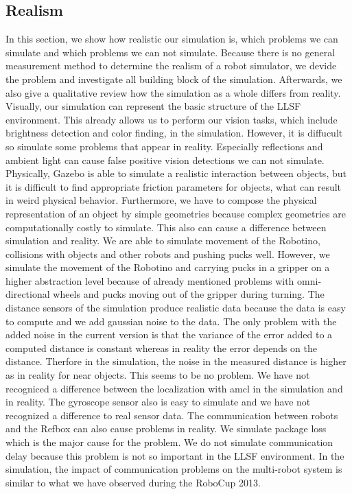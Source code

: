\subsection{Realism}
In this section, we show how realistic our simulation is, which problems we can simulate and which problems we can not simulate. Because there is no general measurement method to determine the realism of a robot simulator, we devide the problem and investigate all building block of the simulation. Afterwards, we also give a qualitative review how the simulation as a whole differs from reality.\\
Visually, our simulation can represent the basic structure of the LLSF environment. This already allows us to perform our vision tasks, which include brightness detection and color finding, in the simulation. However, it is diffucult so simulate some problems that appear in reality. Especially reflections and ambient light can cause false positive vision detections we can not simulate. Physically, Gazebo is able to simulate a realistic interaction between objects, but it is difficult to find appropriate friction parameters for objects, what can result in weird physical behavior. Furthermore, we have to compose the physical representation of an object by simple geometries because complex geometries are computationally costly to simulate. This also can cause a difference between simulation and reality. We are able to simulate movement of the Robotino, collisions with objects and other robots and pushing pucks well. However, we simulate the movement of the Robotino and carrying pucks in a gripper on a higher abstraction level because of already mentioned problems with omni-directional wheels and pucks moving out of the gripper during turning. The distance sensors of the simulation produce realistic data because the data is easy to compute and we add gaussian noise to the data. The only problem with the added noise in the current version is that the variance of the error added to a computed distance is constant whereas in reality the error depends on the distance. Therfore in the simulation, the noise in the measured distance is higher as in reality for near objects. This seems to be no problem. We have not recogniced a difference between the localization with amcl in the simulation and in reality. The gyroscope sensor also is easy to simulate and we have not recognized a difference to real sensor data. The communication between robots and the Refbox can also cause problems in reality. We simulate package loss which is the major cause for the problem. We do not simulate communication delay because this problem is not so important in the LLSF environment. In the simulation, the impact of communication problems on the multi-robot system is similar to what we have observed during the RoboCup 2013.\\
